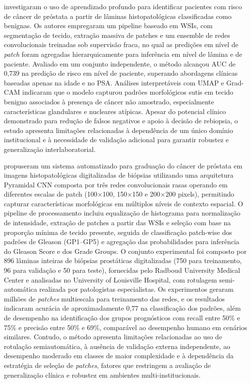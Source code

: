 \cite{liu2022deep} investigaram o uso de aprendizado profundo para identificar pacientes com risco de câncer de próstata a partir de lâminas histopatológicas classificadas como benignas. Os autores empregaram um pipeline baseado em WSIs, com segmentação de tecido, extração massiva de patches e um ensemble de redes convolucionais treinadas sob supervisão fraca, no qual as predições em nível de \textit{patch} foram agregadas hierarquicamente para inferência em nível de lâmina e de paciente. Avaliado em um conjunto independente, o método alcançou AUC de 0,739 na predição de risco em nível de paciente, superando abordagens clínicas baseadas apenas na idade e no PSA. Análises interpretáveis com UMAP e Grad-CAM indicaram que o modelo capturou padrões morfológicos sutis em tecido benigno associados à presença de câncer não amostrado, especialmente características glandulares e nucleares atípicas. Apesar do potencial clínico demonstrado para redução de falsos negativos e apoio à decisão de rebiopsia, o estudo apresenta limitações relacionadas à dependência de um único domínio institucional e à necessidade de validação adicional para garantir robustez e generalização interlaboratorial.

\cite{pyramidalcnn} propuseram um sistema automatizado para graduação do câncer de próstata em imagens histopatológicas digitalizadas de biópsias utilizando uma arquitetura Pyramidal CNN composta por três redes convolucionais rasas operando em diferentes escalas de patch (100×100, 150×150 e 200×200 pixels), permitindo capturar características morfológicas em múltiplos níveis de contexto espacial. O pipeline de processamento incluiu equalização de histograma para normalização de intensidade, extração de patches a partir das WSIs e seleção com base na proporção mínima de tecido presente, seguida de classificação patch-wise dos padrões de Gleason (GP1–GP5) e agregação das probabilidades para inferência do Gleason Score e dos Grade Groups. O conjunto experimental foi composto por 896 lâminas inteiras de biópsias prostáticas digitalizadas (750 para treinamento, 96 para validação e 50 para teste), fornecidas pelo Radboud University Medical Center e analisadas no University of Louisville Hospital, com rotulagem semi-automática realizada por patologistas especialistas. Os experimentos geraram milhões de \textit{patches} multiescala para treinamento das redes, e os resultados indicaram acurácia de aproximadamente 0,77 na classificação dos padrões, além de desempenho na identificação dos grupos prognósticos com recall entre 50\% e 75\% e precisão entre 50\% e 69\%, comparável ao desempenho humano em cenários similares. Contudo, o método apresenta limitações relacionadas ao uso de rotulação semiautomática, à ausência de validação externa independente, ao desempenho moderado em classes de maior complexidade e à dependência da estratégia de seleção de \textit{patches}, fatores que restringem a avaliação de generalização clínica e robustez em ambientes multi-institucionais.

